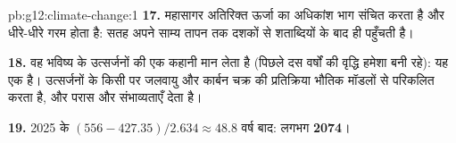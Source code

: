 \begin{solution}{pb:g12:climate-change:1}
\textbf{17.} महासागर अतिरिक्त ऊर्जा का अधिकांश भाग संचित करता है और धीरे-धीरे गरम होता है:
सतह अपने साम्य तापन तक दशकों से शताब्दियों के बाद ही पहुँचती है।

\textbf{18.} वह भविष्य के उत्सर्जनों की एक कहानी मान लेता है (पिछले दस वर्षों की
वृद्धि हमेशा बनी रहे): यह एक  है।  उत्सर्जनों के किसी  पर
जलवायु और कार्बन चक्र की प्रतिक्रिया भौतिक मॉडलों से परिकलित करता है,
और परास और संभाव्यताएँ देता है।

\textbf{19.} 2025 के $(556 - 427.35)/2.634 \approx 48.8$ वर्ष बाद: लगभग
\textbf{2074}।
\end{solution}
